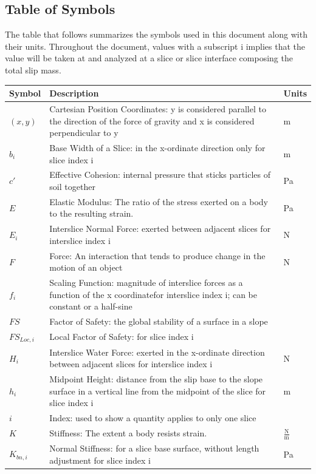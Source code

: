 \documentclass[12pt]{article}
\begin{document}
\subsection{Table of Symbols}
\label{Sec:TablofSymb}
The table that follows summarizes the symbols used in this document along with their units. Throughout the document, values with a subscript i implies that the value will be taken at and analyzed at a slice or slice interface composing the total slip mass.
\begin{longtable*}{l l l}
\toprule
Symbol & Description & Units
\\
\midrule
$(x,y)$ & Cartesian Position Coordinates: y is considered parallel to the direction of the force of gravity and x is considered perpendicular to y & m
\\
$b_{i}$ & Base Width of a Slice: in the x-ordinate direction only for slice index i & m
\\
$c'$ & Effective Cohesion: internal pressure that sticks particles of soil together & Pa
\\
$E$ & Elastic Modulus: The ratio of the stress exerted on a body to the resulting strain. & Pa
\\
$E_{i}$ & Interslice Normal Force: exerted between adjacent slices for interslice index i & N
\\
$F$ & Force: An interaction that tends to produce change in the motion of an object & N
\\
$f_{i}$ & Scaling Function: magnitude of interslice forces as a function of the x coordinatefor interslice index i; can be constant or a half-sine & 
\\
$FS$ & Factor of Safety: the global stability of a surface in a slope & 
\\
$FS_{Loc,i}$ & Local Factor of Safety: for slice index i & 
\\
$H_{i}$ & Interslice Water Force: exerted in the x-ordinate direction between adjacent slices for interslice index i & N
\\
$h_{i}$ & Midpoint Height: distance from the slip base to the slope surface in a vertical line from the midpoint of the slice for slice index i & m
\\
$i$ & Index: used to show a quantity applies to only one slice & 
\\
$K$ & Stiffness: The extent a body resists strain. & $\frac{\text{N}}{\text{m}}$
\\
$K_{bn,i}$ & Normal Stiffness: for a slice base surface, without length adjustment for slice index i & Pa
\\

\end{longtable*}
\end{document}
